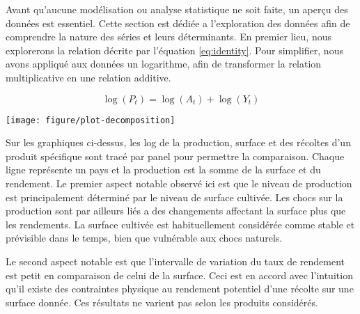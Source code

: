 \documentclass[nojss]{jss}\usepackage{graphicx, color}
\newenvironment{knitrout}{}{} %
\begin{document}
Avant qu'aucune mod\'{e}lisation ou analyse statistique ne soit faite,
un aperçu des donn\'{e}es est essentiel. Cette section est
d\'{e}di\'{e}e a l'exploration des donn\'{e}es afin de comprendre la
nature des s\'{e}ries et leurs d\'{e}terminants. En premier lieu, nous
explorerons la relation d\'{e}crite par l'\'{e}quation
\ref{eq:identity}. Pour simplifier, nous avons appliqu\'{e} aux
donn\'{e}es un logarithme, afin de transformer la relation
multiplicative en une relation additive.

\begin{equation}
  \label{eq:logIdentity}
  \log(P_t) = \log(A_t) + \log(Y_t)
\end{equation}



















\begin{knitrout}
\color{fgcolor}

{\centering \texttt{[image: figure/plot-decomposition]} 

}



\end{knitrout}



Sur les graphiques ci-dessus, les log de la production, surface et des
r\'{e}coltes d'un produit sp\'{e}cifique sont trac\'{e} par panel pour
permettre la comparaison. Chaque ligne repr\'{e}sente un pays et la
production est la somme de la surface et du rendement. Le premier
aspect notable observ\'{e} ici est que le niveau de production est
principalement d\'{e}termin\'{e} par le niveau de surface
cultiv\'{e}e. Les chocs sur la production sont par ailleurs li\'{e}s a
des changements affectant la surface plus que les rendements. La
surface cultiv\'{e}e est habituellement consid\'{e}r\'{e}e comme
stable et pr\'{e}visible dans le temps, bien que vuln\'{e}rable aux
chocs naturels.


Le second aspect notable est que l'intervalle de variation du taux de
rendement est petit en comparaison de celui de la surface. Ceci est en
accord avec l'intuition qu'il existe des contraintes physique au
rendement potentiel d'une r\'{e}colte sur une surface donn\'{e}e. Ces
r\'{e}sultats ne varient pas selon les produits consid\'{e}r\'{e}s.
\end{document}
